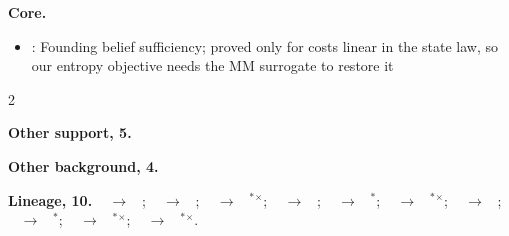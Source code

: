\documentclass[10pt]{article}
\newcommand{\memb}[1]{\par\smallskip\textbf{#1}\quad}
\begin{document}
\memb{Core.}
\begin{itemize}[nosep,leftmargin=1.2em]
\item \citet{Astrom-optimal65}: Founding belief sufficiency; proved only for costs linear in the state law, so our entropy objective needs the MM surrogate to restore it
\end{itemize}
\begin{multicols}{2}
\memb{Other support, 5.} \citetext{\citealp{Smallwood-optimal73}; \citealp{Papadimitriou-complexity87}; \citealp{Singh-learning94}; \citealp{Kaelbling-planning98}; \citealp{Subramanian-approximate20}}

\memb{Other background, 4.} {\footnotesize \citetext{\citealp{Striebel-sufficient65}; \citealp{Astrom-optimal69}\dag; \citealp{Sondik-optimal78}; \citealp{Mundhenk-complexity00}}}

\end{multicols}
\memb{Lineage, 10.} {\footnotesize \citeauthor{Astrom-optimal65}~\citeyear{Astrom-optimal65} $\to$ \citeauthor{Smallwood-optimal73}~\citeyear{Smallwood-optimal73}; \citeauthor{Astrom-optimal65}~\citeyear{Astrom-optimal65} $\to$ \citeauthor{Kaelbling-planning98}~\citeyear{Kaelbling-planning98}; \citeauthor{Astrom-optimal65}~\citeyear{Astrom-optimal65} $\to$ \citeauthor{Wentworth-fixing21}~\citeyear{Wentworth-fixing21}$^\ast$$^\times$; \citeauthor{Smallwood-optimal73}~\citeyear{Smallwood-optimal73} $\to$ \citeauthor{Sondik-optimal78}~\citeyear{Sondik-optimal78}; \citeauthor{Singh-learning94}~\citeyear{Singh-learning94} $\to$ \citeauthor{Kaelbling-planning98}~\citeyear{Kaelbling-planning98}$^\ast$; \citeauthor{McCallum-instancebased95}~\citeyear{McCallum-instancebased95} $\to$ \citeauthor{Subramanian-approximate20}~\citeyear{Subramanian-approximate20}$^\ast$$^\times$; \citeauthor{Kaelbling-planning98}~\citeyear{Kaelbling-planning98} $\to$ \citeauthor{Araya-pomdp10}~\citeyear{Araya-pomdp10}; \citeauthor{Kaelbling-planning98}~\citeyear{Kaelbling-planning98} $\to$ \citeauthor{Subramanian-approximate20}~\citeyear{Subramanian-approximate20}$^\ast$; \citeauthor{Singh-predictive04}~\citeyear{Singh-predictive04} $\to$ \citeauthor{Subramanian-approximate20}~\citeyear{Subramanian-approximate20}$^\ast$$^\times$; \citeauthor{Subramanian-approximate20}~\citeyear{Subramanian-approximate20} $\to$ \citeauthor{Ni-bridging24}~\citeyear{Ni-bridging24}$^\ast$$^\times$.}
\end{document}
